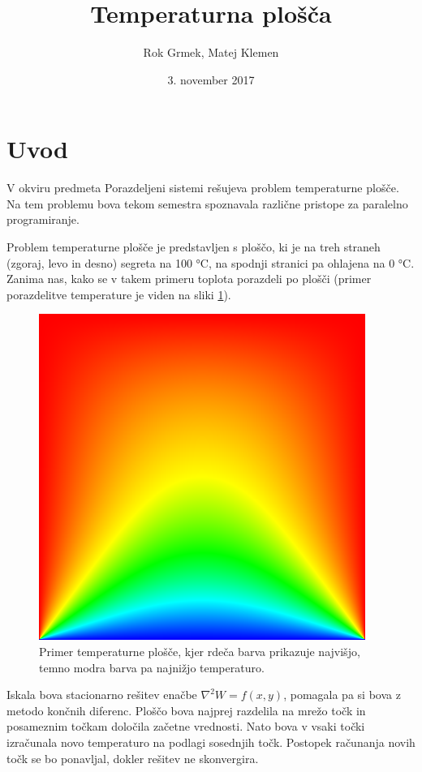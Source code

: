 \documentclass[a4paper,titlepage,11pt]{article}
\title{Temperaturna plošča}
\author{Rok Grmek, Matej Klemen}
\date{3. november 2017}
\begin{document}
\maketitle

\tableofcontents
\pagebreak

\section*{Uvod}

V okviru predmeta Porazdeljeni sistemi rešujeva problem temperaturne plošče. Na tem problemu bova tekom semestra spoznavala različne pristope za paralelno programiranje.

Problem temperaturne plošče je predstavljen s ploščo, ki je na treh straneh (zgoraj, levo in desno) segreta na 100 °C, na spodnji stranici pa ohlajena na 0 °C. Zanima nas, kako se v takem primeru toplota porazdeli po plošči (primer porazdelitve temperature je viden na sliki \ref{slika-primer-temperaturne-plosce}).

\begin{figure}[H]
\begin{center}
\includegraphics[scale=0.6]{primer-temperaturne-plosce.png}
\caption{Primer temperaturne plošče, kjer rdeča barva prikazuje najvišjo, temno modra barva pa najnižjo temperaturo.}
\label{slika-primer-temperaturne-plosce}
\end{center}
\vspace{-25pt}
\end{figure}

Iskala bova stacionarno rešitev enačbe \(\nabla^2 W = f(x, y)\), pomagala pa si bova z metodo končnih diferenc. Ploščo bova najprej razdelila na mrežo točk in posameznim točkam določila začetne vrednosti. Nato bova v vsaki točki izračunala novo temperaturo na podlagi sosednjih točk. Postopek računanja novih točk se bo ponavljal, dokler rešitev ne skonvergira.
\end{document}
